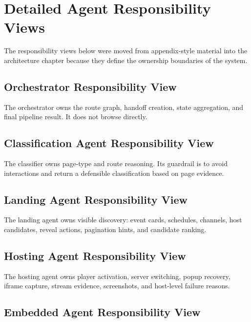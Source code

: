\section{Detailed Agent Responsibility Views}

The responsibility views below were moved from appendix-style material into the
architecture chapter because they define the ownership boundaries of the
system.

\subsection{Orchestrator Responsibility View}



The orchestrator owns the route graph, handoff creation, state aggregation,
and final pipeline result. It does not browse directly.

\subsection{Classification Agent Responsibility View}



The classifier owns page-type and route reasoning. Its guardrail is to avoid
interactions and return a defensible classification based on page evidence.

\subsection{Landing Agent Responsibility View}



The landing agent owns visible discovery: event cards, schedules, channels,
host candidates, reveal actions, pagination hints, and candidate ranking.

\subsection{Hosting Agent Responsibility View}



The hosting agent owns player activation, server switching, popup recovery,
iframe capture, stream evidence, screenshots, and host-level failure reasons.

\subsection{Embedded Agent Responsibility View}

